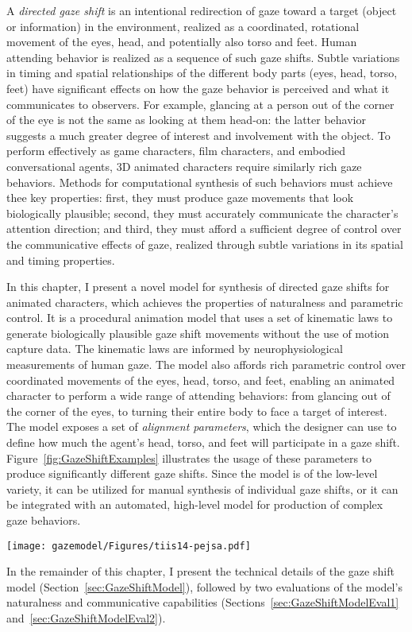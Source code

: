 A \emph{directed gaze shift} is an intentional redirection of gaze toward a target (object or information) in the environment, realized as a coordinated, rotational movement of the eyes, head, and potentially also torso and feet. Human attending behavior is realized as a sequence of such gaze shifts. Subtle variations in timing and spatial relationships of the different body parts (eyes, head, torso, feet) have significant effects on how the gaze behavior is perceived and what it communicates to observers. For example, glancing at a person out of the corner of the eye is not the same as looking at them head-on: the latter behavior suggests a much greater degree of interest and involvement with the object. To perform effectively as game characters, film characters, and embodied conversational agents, 3D animated characters require similarly rich gaze behaviors. Methods for computational synthesis of such behaviors must achieve thee key properties: first, they must produce gaze movements that look biologically plausible; second, they must accurately communicate the character's attention direction; and third, they must afford a sufficient degree of control over the communicative effects of gaze, realized through subtle variations in its spatial and timing properties.

In this chapter, I present a novel model for synthesis of directed gaze shifts for animated characters, which achieves the properties of naturalness and parametric control. It is a procedural animation model that uses a set of kinematic laws to generate biologically plausible gaze shift movements without the use of motion capture data. The kinematic laws are informed by neurophysiological measurements of human gaze. The model also affords rich parametric control over coordinated movements of the eyes, head, torso, and feet, enabling an animated character to perform a wide range of attending behaviors: from glancing out of the corner of the eyes, to turning their entire body to face a target of interest. The model exposes a set of \emph{alignment parameters}, which the designer can use to define how much the agent's head, torso, and feet will participate in a gaze shift. Figure~\ref{fig:GazeShiftExamples} illustrates the usage of these parameters to produce significantly different gaze shifts. Since the model is of the low-level variety, it can be utilized for manual synthesis of individual gaze shifts, or it can be integrated with an automated, high-level model for production of complex gaze behaviors.

\begin{figure*}
\centering
\texttt{[image: gazemodel/Figures/tiis14-pejsa.pdf]}
\caption{Examples of gaze shifts synthesized using our model. All gaze shifts are toward the same target (the red sphere). (1) Initially the agent maintains eye contact with the observer. (2) Gaze shift to the side with low value of the head alignment parameter. (3) Gaze shift in the same direction, but with high head alignment value. (4) Gaze shift in the same direction with a high torso alignment value. (5) Gaze shift in the same direction with a high whole-body alignment value.}
\label{fig:GazeShiftExamples}
\end{figure*}

In the remainder of this chapter, I present the technical details of the gaze shift model (Section~\ref{sec:GazeShiftModel}), followed by two evaluations of the model's naturalness and communicative capabilities (Sections~\ref{sec:GazeShiftModelEval1} and~\ref{sec:GazeShiftModelEval2}).
